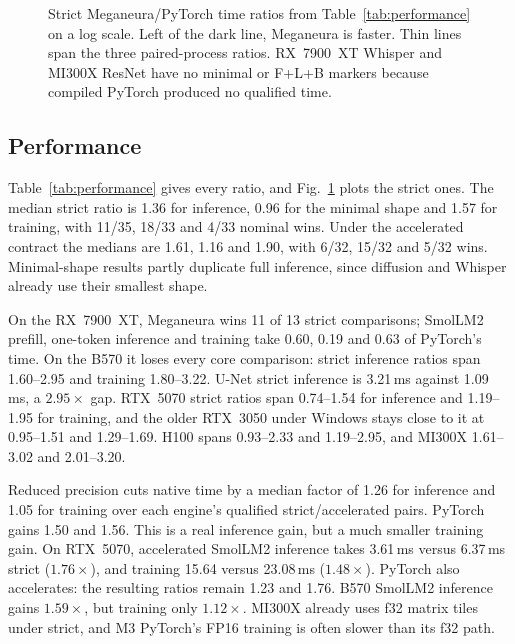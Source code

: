 \documentclass[conference]{IEEEtran}
\newcommand{\system}{Meganeura}
\begin{document}
\begin{figure}[t]
\centering
\resizebox{\textwidth}{!}{}
\caption{Strict \system{}/PyTorch time ratios from Table~\ref{tab:performance}
on a log scale. Left of the dark line, \system{} is faster. Thin lines span
the three paired-process ratios. RX~7900~XT Whisper and MI300X ResNet have no
minimal or F+L+B markers because compiled PyTorch produced no qualified time.}
\label{fig:ratios}
\end{figure}

\subsection{Performance}
\label{sec:performance}

Table~\ref{tab:performance} gives every ratio, and Fig.~\ref{fig:ratios}
plots the strict ones. The median strict ratio is 1.36 for inference, 0.96
for the minimal shape and 1.57 for training, with 11/35, 18/33 and 4/33 nominal
wins. Under the accelerated contract the medians are 1.61, 1.16 and 1.90,
with 6/32, 15/32 and 5/32 wins. Minimal-shape results partly duplicate full
inference, since diffusion and Whisper already use their smallest shape.

On the RX~7900~XT, \system{} wins 11 of 13 strict comparisons; SmolLM2
prefill, one-token inference and training take 0.60, 0.19 and 0.63 of
PyTorch's time. On the B570 it loses every core comparison: strict inference
ratios span 1.60--2.95 and training 1.80--3.22. U-Net strict inference is
3.21\,ms against 1.09\,ms, a $2.95\times$ gap. RTX~5070 strict ratios span
0.74--1.54 for inference and 1.19--1.95 for training, and the older RTX~3050
under Windows stays close to it at 0.95--1.51 and 1.29--1.69. H100 spans
0.93--2.33 and 1.19--2.95, and MI300X 1.61--3.02 and 2.01--3.20.

Reduced precision cuts native time by a median factor of 1.26 for inference
and 1.05 for training over each engine's qualified strict/accelerated pairs.
PyTorch gains 1.50 and 1.56. This is a real inference gain, but a much
smaller training gain. On RTX~5070, accelerated SmolLM2 inference takes
3.61\,ms versus 6.37\,ms strict ($1.76\times$), and training 15.64 versus
23.08\,ms ($1.48\times$). PyTorch also accelerates: the resulting ratios
remain 1.23 and 1.76. B570 SmolLM2 inference gains $1.59\times$, but training
only $1.12\times$. MI300X already uses f32 matrix tiles under strict, and M3
PyTorch's FP16 training is often slower than its f32 path.
\end{document}
